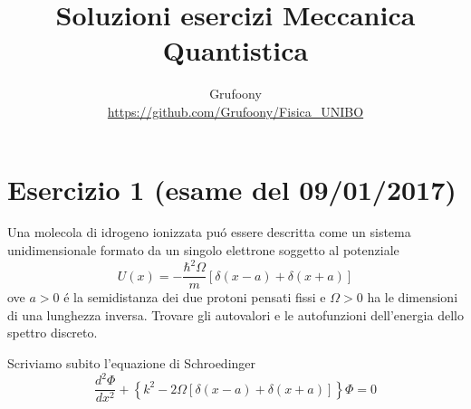 \documentclass[a4paper]{article}
\begin{document}
	\title{Soluzioni esercizi Meccanica Quantistica}
	\author{Grufoony\\\url{https://github.com/Grufoony/Fisica_UNIBO}}
	\maketitle

    \section*{Esercizio 1 (esame del 09/01/2017)}
        Una molecola di idrogeno ionizzata pu\'o essere descritta come un sistema unidimensionale formato da un singolo elettrone soggetto al potenziale
        \begin{equation*}
            U(x)=-\frac{\hbar^2\Omega}{m}\left[\delta(x-a)+\delta(x+a)\right]
        \end{equation*}
        ove $a>0$ \'e la semidistanza dei due protoni pensati fissi e $\Omega>0$ ha le dimensioni di una lunghezza inversa.
        Trovare gli autovalori e le autofunzioni dell'energia dello spettro discreto.
        \begin{figure}[H]
            \centering
        \end{figure}
        Scriviamo subito l'equazione di Schroedinger
        \begin{equation*}
            \frac{d^2\Phi}{dx^2}+\left\{k^2-2\Omega\left[\delta(x-a)+\delta(x+a)\right]\right\}\Phi=0
        \end{equation*}
\end{document}
